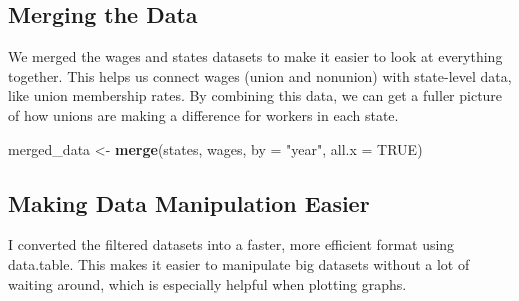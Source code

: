 \documentclass[
]{book}
\newenvironment{Shaded}{\begin{snugshade}}{\end{snugshade}}
\newcommand{\AttributeTok}[1]{\textcolor[rgb]{0.13,0.29,0.53}{#1}}
\newcommand{\ConstantTok}[1]{\textcolor[rgb]{0.56,0.35,0.01}{#1}}
\newcommand{\DecValTok}[1]{\textcolor[rgb]{0.00,0.00,0.81}{#1}}
\newcommand{\FunctionTok}[1]{\textcolor[rgb]{0.13,0.29,0.53}{\textbf{#1}}}
\newcommand{\NormalTok}[1]{#1}
\newcommand{\OtherTok}[1]{\textcolor[rgb]{0.56,0.35,0.01}{#1}}
\newcommand{\SpecialCharTok}[1]{\textcolor[rgb]{0.81,0.36,0.00}{\textbf{#1}}}
\newcommand{\StringTok}[1]{\textcolor[rgb]{0.31,0.60,0.02}{#1}}
\theoremstyle{definition}
\theoremstyle{definition}
\theoremstyle{definition}
\theoremstyle{definition}
\theoremstyle{remark}
\begin{document}
\begin{Shaded}
\end{Shaded}

\subsection{Merging the Data}\label{merging-the-data}

We merged the wages and states datasets to make it easier to look at everything together. This helps us connect wages (union and nonunion) with state-level data, like union membership rates. By combining this data, we can get a fuller picture of how unions are making a difference for workers in each state.

\begin{Shaded}
\begin{Highlighting}[]
\NormalTok{merged\_data }\OtherTok{\textless{}{-}} \FunctionTok{merge}\NormalTok{(states, wages, }\AttributeTok{by =} \StringTok{"year"}\NormalTok{, }\AttributeTok{all.x =} \ConstantTok{TRUE}\NormalTok{)}
\end{Highlighting}
\end{Shaded}

\subsection{Making Data Manipulation Easier}\label{making-data-manipulation-easier}

I converted the filtered datasets into a faster, more efficient format using data.table. This makes it easier to manipulate big datasets without a lot of waiting around, which is especially helpful when plotting graphs.
\end{document}
